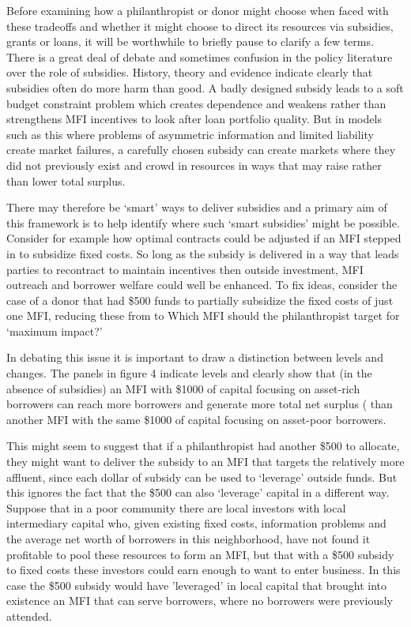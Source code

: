 \documentclass{article}
\begin{document}
Before examining how a philanthropist or donor might choose when faced
with these tradeoffs and whether it might choose to direct its resources
via subsidies, grants or loans, it will be worthwhile to briefly pause
to clarify a few terms. There is a great deal of debate and sometimes
confusion in the policy literature over the role of subsidies. History,
theory and evidence indicate clearly that subsidies often do more harm
than good. A badly designed subsidy leads to a soft budget constraint
problem which creates dependence and weakens rather than strengthens MFI
incentives to look after loan portfolio quality. But in models such as
this where problems of asymmetric information and limited liability
create market failures, a carefully chosen subsidy can create markets
where they did not previously exist and crowd in resources in ways that
may raise rather than lower total surplus.

There may therefore be `smart' ways to deliver subsidies and a primary
aim of this framework is to help identify where such `smart subsidies'
might be possible. Consider for example how optimal contracts could be
adjusted if an MFI stepped in to subsidize fixed costs. So long as the
subsidy is delivered in a way that leads parties to recontract to
maintain incentives then outside investment, MFI outreach and borrower
welfare could well be enhanced. To fix ideas, consider the case of a
donor that had \$500 funds to partially subsidize the fixed costs of
just one MFI, reducing these from to Which MFI should the philanthropist
target for `maximum impact?'

In debating this issue it is important to draw a distinction between
levels and changes. The panels in figure 4 indicate levels and clearly
show that (in the absence of subsidies) an MFI with \$1000 of capital
focusing on asset-rich borrowers can reach more borrowers and generate
more total net surplus ( than another MFI with the same \$1000 of
capital focusing on asset-poor borrowers.

This might seem to suggest that if a philanthropist had another \$500 to
allocate, they might want to deliver the subsidy to an MFI that targets
the relatively more affluent, since each dollar of subsidy can be used
to `leverage' outside funds. But this ignores the fact that the \$500
can also `leverage' capital in a different way. Suppose that in a poor
community there are local investors with local intermediary capital who,
given existing fixed costs, information problems and the average net
worth of borrowers in this neighborhood, have not found it profitable to
pool these resources to form an MFI, but that with a \$500 subsidy to
fixed costs these investors could earn enough to want to enter business.
In this case the \$500 subsidy would have 'leveraged' in local capital
that brought into existence an MFI that can serve borrowers, where no
borrowers were previously attended.
\end{document}
